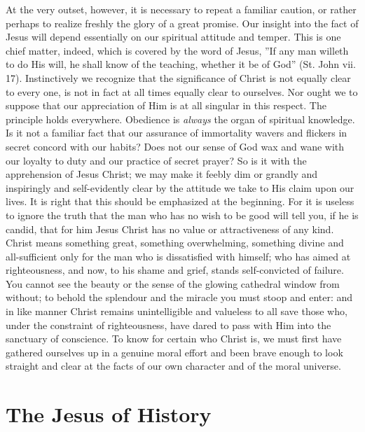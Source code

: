 \documentclass[12pt,a5paper,oneside]{book}
\begin{document}
At the very outset, however, it is necessary 
to repeat a familiar caution, or rather perhaps
to realize freshly the glory of a great promise.
Our insight into the fact of Jesus will depend 
essentially on our spiritual attitude and
temper. This is one chief matter, indeed,
which is covered by the word of Jesus,
''If any man willeth to do His will, he shall know
of the teaching, whether it be of God'' (St. 
John vii. 17). Instinctively we recognize that
the significance of Christ is not equally clear to
every one, is not in fact at all times equally 
clear to ourselves. Nor ought we to suppose 
that our appreciation of Him is at all singular
in this respect. The principle holds everywhere.
Obedience is \textit{always} the organ of spiritual knowledge.
Is it not a familiar fact that our assurance 
of immortality wavers and flickers in 
secret concord with our habits? Does not our
sense of God wax and wane with our loyalty
to duty and our practice of secret prayer? So is 
it with the apprehension of Jesus Christ; we may 
make it feebly dim or grandly and inspiringly
and self-evidently clear by the attitude we take 
to His claim upon our lives. It is right that
this should be emphasized at the beginning. 
For it is useless to ignore the truth that the man
who has no wish to be good will tell you, 
if he is candid, that for him Jesus Christ has 
no value or attractiveness of any kind. Christ
means something great, something overwhelming, something divine and all-sufficient only
for the man who is dissatisfied with himself;
who has aimed at righteousness, and now, to
his shame and grief, stands self-convicted of 
failure. You cannot see the beauty or the
sense of the glowing cathedral window from
without; to behold the splendour and the
miracle you must stoop and enter: and in like
manner Christ remains unintelligible and valueless 
to all save those who, under the constraint
of righteousness, have dared to pass with Him 
into the sanctuary of conscience. To know for
certain who Christ is, we must first have
gathered ourselves up in a genuine moral effort
and been brave enough to look straight and
clear at the facts of our own character and of
the moral universe.

\mainmatter

\chapter{The Jesus of History} 
\end{document}
